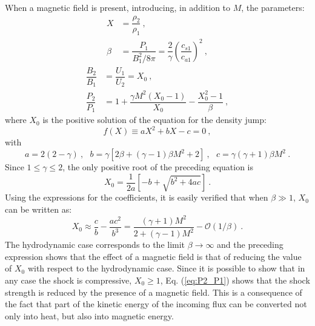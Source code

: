 \documentclass[12pt,a4paper]{article}
\begin{document}
When a magnetic field is present, introducing, in addition to $M$, the parameters:
\begin{align*}
X &= \dfrac{\rho_2}{\rho_1} ~, \\
\beta &= \dfrac{P_1}{B_1^2/8\pi} = \dfrac{2}{\gamma} \left(\dfrac{c_{s1}}{c_{a1}} \right)^2 ~,
\end{align*}
\begin{align}
\dfrac{B_2}{B_1} &= \dfrac{U_1}{U_2} = X_0 ~, \\
\dfrac{P_2}{P_1} &= 1+\dfrac{\gamma M^2 (X_0 -1)}{X_0} - \dfrac{X_0^2 -1}{\beta} ~, \label{eq:P2_P1}
\end{align}
where $X_0$ is the positive solution of the equation for the density jump:
\begin{equation}
f(X) \equiv a X^2 +bX -c = 0 ~,
\end{equation}
with 
\begin{equation}
a = 2(2-\gamma) ~, ~~~ b = \gamma[2\beta +(\gamma-1)\beta M^2 +2] ~, ~~~ c = \gamma(\gamma +1) \beta M^2 ~.
\end{equation}
Since $1 \leqslant \gamma \leqslant 2$, the only positive root of the preceding equation is
\begin{equation}
X_0 = \dfrac{1}{2a} \left[-b +\sqrt{b^2 +4ac} \right] ~.
\end{equation}
Using the expressions for the coefficients, it is easily verified that when $\beta \gg 1$, $X_0$ can be written as:
\begin{equation}
X_0 \approx \dfrac{c}{b} - \dfrac{ac^2}{b^3} = \dfrac{(\gamma+1)M^2}{2+(\gamma-1) M^2} -\mathcal{O}(1/\beta) ~.
\end{equation}
The hydrodynamic case corresponds to the limit $\beta \rightarrow \infty$ and the preceding expression shows that the effect of a magnetic field is that of reducing the value of $X_0$ with respect to the hydrodynamic case. Since it is possible to show that in any case the shock is compressive, $X_0 \geqslant 1$, Eq. (\ref{eq:P2_P1}) shows that the shock strength is reduced by the presence of a magnetic field. This is a consequence of the fact that part of the kinetic energy of the incoming flux can be converted not only into heat, but also into magnetic energy.
\end{document}
